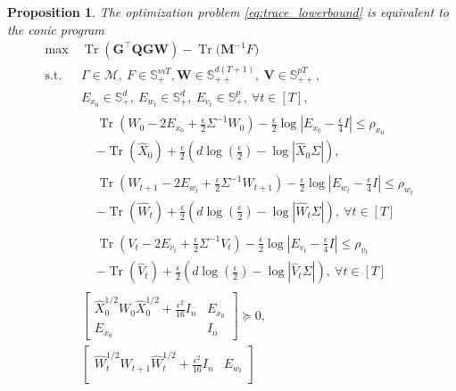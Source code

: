 \documentclass[letterpaper, 10 pt, conference]{ieeeconf}  %
\theoremstyle{ieeeconf}
\newtheorem{proposition}{Proposition}
\DeclareMathOperator{\Tr}{Tr}
\begin{document}
\begin{proposition}
\label{prop:SDP_reformulation}
The optimization problem \eqref{eq:trace_lowerbound} is equivalent to the conic program
\begin{align*}
\max \ 
&\Tr(\mathbf{G^{\top} Q G W}) - 
\Tr\big(\mathbf{M}^{-1} F\big)
\\
\text{s.t.} \
&\Gamma \in \mathcal{M}, \ 
F \in \mathbb{S}_{+}^{mT},\mathbf{W} \in \mathbb{S}_{++}^{d(T+1)}, \ 
\mathbf{V} \in \mathbb{S}_{++}^{pT},
\\[1pt]
& E_{x_0} \in \mathbb{S}_{+}^{d}, \ 
E_{w_t} \in \mathbb{S}_{+}^{d}, \ 
E_{v_t} \in \mathbb{S}_{+}^{p}, \ \forall t \in [T],
\\[2pt]
&\begin{aligned}
&\Tr\!\left(\!W_0\! -\! 2E_{x_0}\!+\!\frac{\epsilon}{2}\Sigma^{-1}W_0\!\right)\! -\! \frac{\epsilon}{2}\log\left|E_{x_0}\! - \frac{\epsilon}{4}I\right| \leq \rho_{x_0}
\\
&- \Tr(\hat{X}_0) + \frac{\epsilon}{2}\left(d\log\left(\frac{\epsilon}{2}\right)-\log|\hat{X}_0\Sigma|\right),
\end{aligned}
\\[2pt]
&\begin{aligned}
&\Tr\left(\!W_{t+1}\!\! -\! 2E_{w_t}\!\!+\!\frac{\epsilon}{2}\Sigma^{-1}W_{t+1}\!\right)\!\! -\! \frac{\epsilon}{2}\!\log\!\left|E_{w_t}\!\! -\! \frac{\epsilon}{4}I\right|\! \!\leq\! \rho_{w_t}
\\
&- \Tr(\hat{W}_t) + \frac{\epsilon}{2}\left(d\log\left(\frac{\epsilon}{2}\right)-\log|\hat{W}_t\Sigma|\right),\ \forall t \in [T]
\end{aligned}
\\[2pt]
&\begin{aligned}
&\Tr\left(V_{t}\! -\! 2E_{v_t}\!+\!\frac{\epsilon}{2}\Sigma^{-1}V_{t}\right)\!-\! \frac{\epsilon}{2}\log\left|E_{v_t}\! -\! \frac{\epsilon}{4}I\right| \leq\rho_{v_t}
\\
&- \Tr(\hat{V}_t) + \frac{\epsilon}{2}\left(d\log\left(\frac{\epsilon}{2}\right)-\log|\hat{V}_t\Sigma|\right),\ \forall t \in [T]
\end{aligned}
\\[2pt]
& 
\begin{bmatrix}
\hat{X}_0^{1/2} W_0 \hat{X}_0^{1/2} +\frac{\epsilon^2}{16}I_n & E_{x_0} \\
E_{x_0} & I_n
\end{bmatrix} \succeq 0, 
\\[1pt]
& 
\begin{bmatrix}
\hat{W}_t^{1/2} W_{t+1} \hat{W}_t^{1/2} +\frac{\epsilon^2}{16}I_n & E_{w_t} \\

\end{bmatrix}
\end{align*}
\end{proposition}
\end{document}
